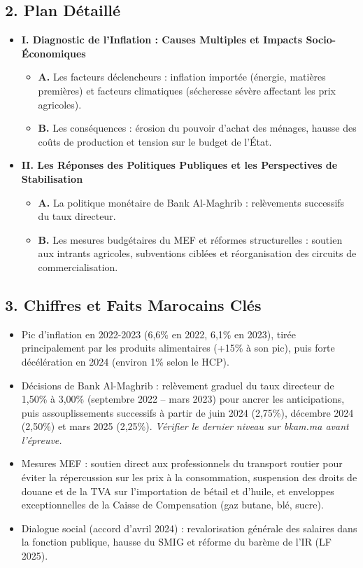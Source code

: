 \subsection*{2. Plan Détaillé}
\begin{itemize}
    \item \textbf{I. Diagnostic de l'Inflation : Causes Multiples et Impacts Socio-Économiques}
    \begin{itemize}
        \item \textbf{A.} Les facteurs déclencheurs : inflation importée (énergie, matières premières) et facteurs climatiques (sécheresse sévère affectant les prix agricoles).
        \item \textbf{B.} Les conséquences : érosion du pouvoir d'achat des ménages, hausse des coûts de production et tension sur le budget de l'État.
    \end{itemize}
    \item \textbf{II. Les Réponses des Politiques Publiques et les Perspectives de Stabilisation}
    \begin{itemize}
        \item \textbf{A.} La politique monétaire de Bank Al-Maghrib : relèvements successifs du taux directeur.
        \item \textbf{B.} Les mesures budgétaires du MEF et réformes structurelles : soutien aux intrants agricoles, subventions ciblées et réorganisation des circuits de commercialisation.
    \end{itemize}
\end{itemize}

\subsection*{3. Chiffres et Faits Marocains Clés}
\begin{itemize}
    \item Pic d'inflation en 2022-2023 (6,6\% en 2022, 6,1\% en 2023), tirée principalement par les produits alimentaires (+15\% à son pic), puis forte décélération en 2024 (environ 1\% selon le HCP).
    \item Décisions de Bank Al-Maghrib : relèvement graduel du taux directeur de 1,50\% à 3,00\% (septembre 2022 -- mars 2023) pour ancrer les anticipations, puis assouplissements successifs à partir de juin 2024 (2,75\%), décembre 2024 (2,50\%) et mars 2025 (2,25\%). \textit{Vérifier le dernier niveau sur bkam.ma avant l'épreuve.}
    \item Mesures MEF : soutien direct aux professionnels du transport routier pour éviter la répercussion sur les prix à la consommation, suspension des droits de douane et de la TVA sur l'importation de bétail et d'huile, et enveloppes exceptionnelles de la Caisse de Compensation (gaz butane, blé, sucre).
    \item Dialogue social (accord d'avril 2024) : revalorisation générale des salaires dans la fonction publique, hausse du SMIG et réforme du barème de l'IR (LF 2025).
\end{itemize}

